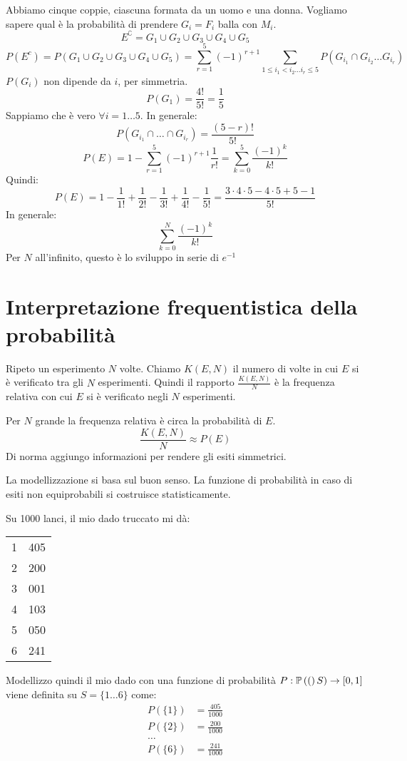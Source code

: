 \begin{exmp}
Abbiamo cinque coppie, ciascuna formata da un uomo e una donna. Vogliamo sapere qual \`e la probabilit\`a di prendere $G_i = F_i$ balla con $M_i$.
\[
E^{\complement} = G_1 \cup G_2 \cup G_3 \cup G_4 \cup G_5
\]
\[
P(E^c) = P(G_1 \cup G_2 \cup G_3 \cup G_4 \cup G_5) = \sum_{r = 1}^{5} (-1)^{r +1} \sum_{1 \le i_1 < i_2 \dots i_r \le 5} P( G_{i_1} \cap G_{i_2} \dots G_{i_r})
\]
$P(G_i)$ non dipende da $i$, per simmetria.
\[
P(G_1) = \frac{4!}{5!} = \frac{1}{5}
\]
Sappiamo che \`e vero $\forall i = 1 \dots 5$. In generale:
\[
P( G_{i_1} \cap \dots \cap G_{i_r}) = \frac{(5 - r)!}{5!}
\]
\[
P(E) = 1 - \sum_{r = 1}^{5} (-1)^{r+1} \frac{1}{r!} = 
\sum_{k = 0}^{5} \frac{(-1)^k}{k!}
\]
Quindi:
\[
P(E) = 1 - \frac{1}{1!} + \frac{1}{2!} - \frac{1}{3!} + \frac{1}{4!} - \frac{1}{5!} = 
\frac{3 \cdot 4 \cdot 5 - 4 \cdot 5 + 5 - 1}{5!}
\]
In generale:
\[
\sum_{k = 0}^{N} \frac{(-1)^k}{k!}
\]
Per $N$ all'infinito, questo \`e lo sviluppo in serie di $e^{-1}$
\end{exmp}
\section{Interpretazione frequentistica della probabilit\`a}

Ripeto un esperimento $N$ volte. Chiamo $K(E, N)$ il numero di volte in cui $E$ si \`e verificato tra gli $N$ esperimenti. Quindi il rapporto $\frac{K(E, N)}{N}$ \`e la frequenza relativa con cui $E$ si \`e verificato negli $N$ esperimenti.

Per $N$ grande la frequenza relativa \`e circa la probabilit\`a di $E$.
\[
\frac{K(E,N)}{N} \approx P(E)
\]
Di norma aggiungo informazioni per rendere gli esiti simmetrici.

La modellizzazione si basa sul buon senso. La funzione di probabilit\`a in caso di esiti non equiprobabili si costruisce statisticamente.

Su 1000 lanci, il mio dado truccato mi d\`a:

\begin{tabular}{cc}
1 & 405 \\
2 & 200 \\
3 & 001 \\
4 & 103 \\
5 & 050 \\
6 & 241
\end{tabular}

Modellizzo quindi il mio dado con una funzione di probabilit\`a $P : \mathbb{P} \left( {(} \right)S) \to [0,1]$ viene definita su $S = \{ 1 \dots 6 \}$ come:
\begin{align*}
P(\{1\}) &= \frac{405}{1000} \\
P(\{2\}) &= \frac{200}{1000} \\
\dots & \\
P(\{6\}) &= \frac{241}{1000}
\end{align*}

